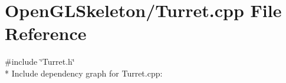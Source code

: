 \section{Open\+G\+L\+Skeleton/\+Turret.cpp File Reference}
\label{_turret_8cpp}
{\ttfamily \#include \char`\"{}Turret.\+h\char`\"{}}\\*
Include dependency graph for Turret.\+cpp\+:
